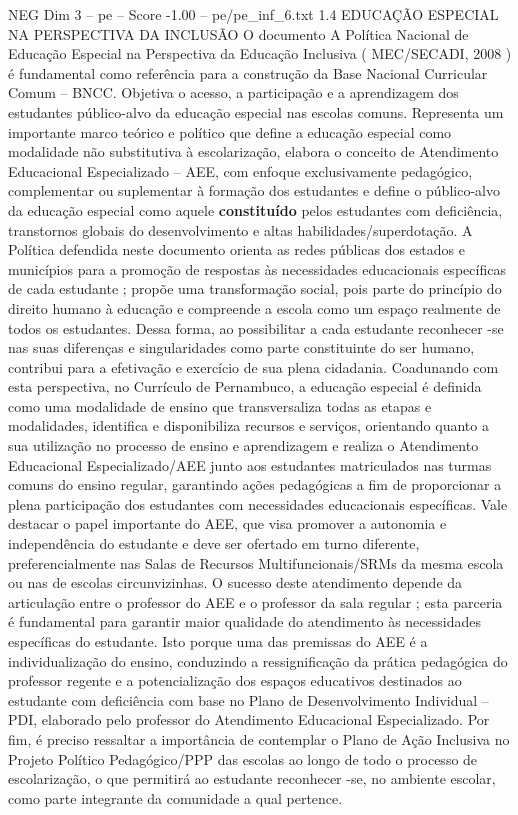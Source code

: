 \begin{textsample}{NEG Dim 3 – pe – Score -1.00 – pe/pe\_inf\_6.txt}  \label{ex:f3_neg_003}
1.4 EDUCAÇÃO ESPECIAL NA PERSPECTIVA DA INCLUSÃO O documento A Política Nacional de Educação Especial na Perspectiva da Educação Inclusiva ( MEC/SECADI, 2008 ) é fundamental como referência para a construção da Base Nacional Curricular Comum – BNCC.
Objetiva o acesso, a participação e a aprendizagem dos estudantes público-alvo da educação especial nas escolas comuns.
Representa um importante marco teórico e político que define a educação especial como modalidade não substitutiva à escolarização, elabora o conceito de Atendimento Educacional Especializado – AEE, com enfoque exclusivamente pedagógico, complementar ou suplementar à formação dos estudantes e define o público-alvo da educação especial como aquele \textbf{constituído} pelos estudantes com deficiência, transtornos globais do desenvolvimento e altas habilidades/superdotação.
A Política defendida neste documento orienta as redes públicas dos estados e municípios para a promoção de respostas às necessidades educacionais específicas de cada estudante ; propõe uma transformação social, pois parte do princípio do direito humano à educação e compreende a escola como um espaço realmente de todos os estudantes.
Dessa forma, ao possibilitar a cada estudante reconhecer -se nas suas diferenças e singularidades como parte constituinte do ser humano, contribui para a efetivação e exercício de sua plena cidadania.
Coadunando com esta perspectiva, no Currículo de Pernambuco, a educação especial é definida como uma modalidade de ensino que transversaliza todas as etapas e modalidades, identifica e disponibiliza recursos e serviços, orientando quanto a sua utilização no processo de ensino e aprendizagem e realiza o Atendimento Educacional Especializado/AEE junto aos estudantes matriculados nas turmas comuns do ensino regular, garantindo ações pedagógicas a fim de proporcionar a plena participação dos estudantes com necessidades educacionais específicas.
Vale destacar o papel importante do AEE, que visa promover a autonomia e independência do estudante e deve ser ofertado em turno diferente, preferencialmente nas Salas de Recursos Multifuncionais/SRMs da mesma escola ou nas de escolas circunvizinhas.
O sucesso deste atendimento depende da articulação entre o professor do AEE e o professor da sala regular ; esta parceria é fundamental para garantir maior qualidade do atendimento às necessidades específicas do estudante.
Isto porque uma das premissas do AEE é a individualização do ensino, conduzindo a ressignificação da prática pedagógica do professor regente e a potencialização dos espaços educativos destinados ao estudante com deficiência com base no Plano de Desenvolvimento Individual – PDI, elaborado pelo professor do Atendimento Educacional Especializado.
Por fim, é preciso ressaltar a importância de contemplar o Plano de Ação Inclusiva no Projeto Político Pedagógico/PPP das escolas ao longo de todo o processo de escolarização, o que permitirá ao estudante reconhecer -se, no ambiente escolar, como parte integrante da comunidade a qual pertence.

\end{textsample}
